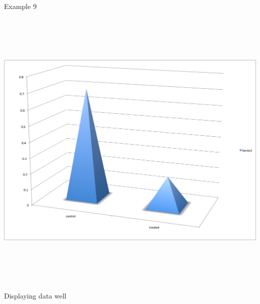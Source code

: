 \documentclass[12pt]{article}
\newcommand{\headsize}{\fontsize{35}{35} \selectfont}
\newcommand{\smallsize}{\fontsize{25}{30} \selectfont}
\begin{document}
\newpage


\headsize \color{myyellow}
\hfill \begin{minipage}{5.75in}
\centering
Example 9
\end{minipage}

\vspace{30mm}

\centerline{\includegraphics[height=5.5in]{Figs/fig9g.png}}


\newpage

\headsize \color{myyellow}
\hfill \begin{minipage}{5.75in}
\centering
Displaying data well
\end{minipage}

\vspace{30mm}
\smallsize \color{mywhite}
\end{document}
